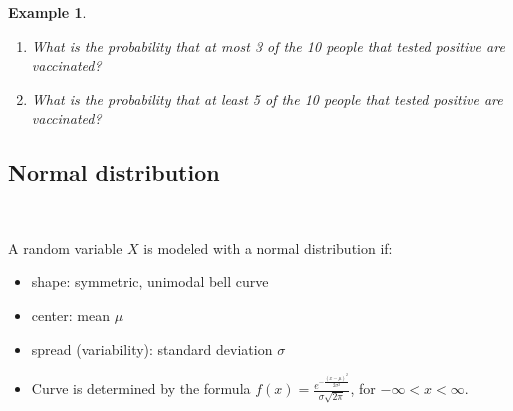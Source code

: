 \documentclass[12pt]{amsart}
\newtheorem{example}[theorem]{Example}
\newcommand{\m}{\mu}
\newcommand{\s}{\sigma}
\begin{document}
{\begin{example}
\begin{enumerate}
\vspace{5cm}

\item What is the probability that at most 3 of the 10 people that tested positive are vaccinated?

%

\vspace{5.5cm}

\item What is the probability that at least 5 of the 10 people that tested positive are vaccinated?

%



\end{enumerate}

\end{example} 



\newpage


\vspace{.5cm}

\subsection{Normal distribution} $\ $ \newline

A random variable $X$ is modeled with a normal distribution if:
\begin{itemize}
\item shape: symmetric, unimodal bell curve
\item center: mean $\m$
\item spread (variability): standard deviation $\s$
\item Curve is determined by the formula $f(x) = \frac{e^{-\frac{(x-\m)^2}{2\s^2}}}{\s\sqrt{2\pi}}$, for $-\infty < x< \infty$.


\end{itemize}}
\end{document}
